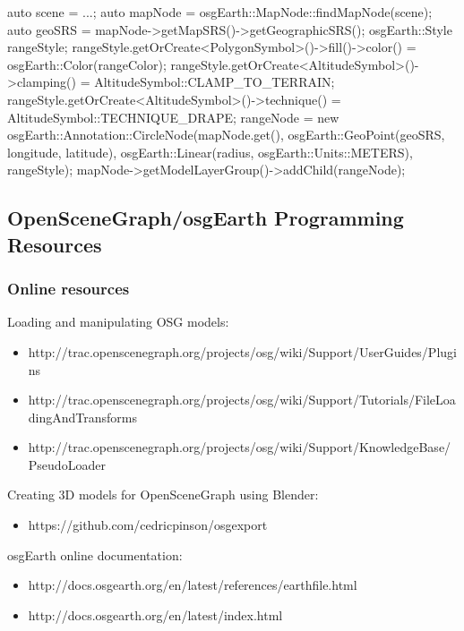 \begin{cpp}
auto scene = ...;
auto mapNode = osgEarth::MapNode::findMapNode(scene);
auto geoSRS = mapNode->getMapSRS()->getGeographicSRS();
osgEarth::Style rangeStyle;
rangeStyle.getOrCreate<PolygonSymbol>()->fill()->color() =
                                        osgEarth::Color(rangeColor);
rangeStyle.getOrCreate<AltitudeSymbol>()->clamping() =
                                        AltitudeSymbol::CLAMP_TO_TERRAIN;
rangeStyle.getOrCreate<AltitudeSymbol>()->technique() =
                                        AltitudeSymbol::TECHNIQUE_DRAPE;
rangeNode = new osgEarth::Annotation::CircleNode(mapNode.get(),
    osgEarth::GeoPoint(geoSRS, longitude, latitude),
    osgEarth::Linear(radius, osgEarth::Units::METERS), rangeStyle);
mapNode->getModelLayerGroup()->addChild(rangeNode);
\end{cpp}


\subsection{OpenSceneGraph/osgEarth Programming Resources}
\label{sec:graphics:osg-osgearth-programming-resources}

\subsubsection{Online resources}
\label{sec:graphics:osg-osgearth-online-resources}

Loading and manipulating OSG models:
\begin{itemize}
\item http://trac.openscenegraph.org/projects/osg/wiki/Support/UserGuides/Plugins
\item http://trac.openscenegraph.org/projects/osg/wiki/Support/Tutorials/FileLoadingAndTransforms
\item http://trac.openscenegraph.org/projects/osg/wiki/Support/KnowledgeBase/PseudoLoader
\end{itemize}

Creating 3D models for OpenSceneGraph using Blender:
\begin{itemize}
\item https://github.com/cedricpinson/osgexport
\end{itemize}

osgEarth online documentation:
\begin{itemize}
\item http://docs.osgearth.org/en/latest/references/earthfile.html
\item http://docs.osgearth.org/en/latest/index.html
\end{itemize}

